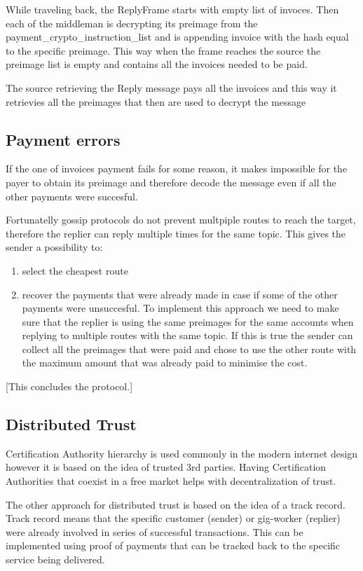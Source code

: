 \documentclass{article}
\begin{document}
While traveling back, the ReplyFrame starts with empty list of invoces. Then each of the middleman is decrypting  its preimage from the payment\_crypto\_instruction\_list and is appending invoice with the hash equal to the specific preimage. This way when the frame reaches the source the preimage list is empty and contains all the invoices needed to be paid.

The source retrieving the Reply message pays all the invoices and this way it retrievies all the preimages that then are used to decrypt the message

\subsection{Payment errors}

If the one of invoices payment fails for some reason, it makes impossible for the payer to obtain its preimage and therefore decode the message even if all the other payments were succesful.

Fortunatelly gossip protocols do not prevent multpiple routes to reach the target, therefore the replier can reply multiple times for the same topic. This gives the sender a possibility to:

\begin{enumerate}
	\item select the cheapest route
	\item recover the payments that were already made in case if some of the other payments were unsuccesful. To implement this approach we need to make sure that the replier is using the same preimages for the same accounts when replying to multiple routes with the same topic. If this is true the sender can collect all the preimages that were paid and chose to use the other route with the maximum amount that was already paid to minimise the cost.
\end{enumerate}

[This concludes the protocol.]

\subsection{Distributed Trust}

Certification Authority hierarchy is used commonly in the modern internet design however it is based on the idea of trusted 3rd parties. Having Certification Authorities that coexist in a free market helps with decentralization of trust.

The other approach for distributed trust is based on the idea of a track record. Track record means that the specific customer (sender) or gig-worker (replier) were already involved in series of successful transactions. This can be implemented using proof of payments that can be tracked back to the specific service being delivered.
\end{document}
